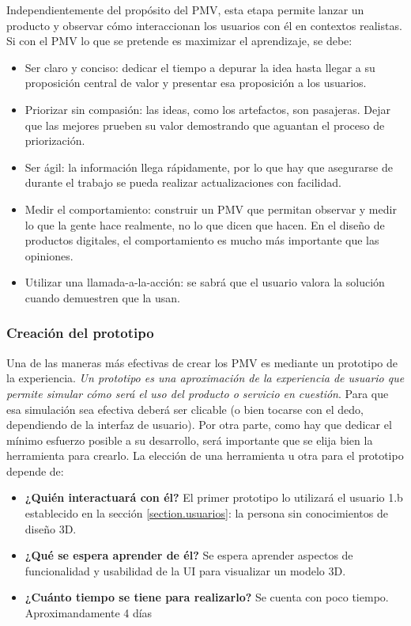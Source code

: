Independientemente del propósito del PMV, esta etapa permite lanzar un producto y observar cómo interaccionan los usuarios con él en contextos realistas. Si con el PMV lo que se pretende es maximizar el aprendizaje, se debe:
\begin{itemize}
    \item Ser claro y conciso: dedicar el tiempo a depurar la idea hasta llegar a su proposición central de valor y presentar esa proposición a los usuarios. 
    \item Priorizar sin compasión: las ideas, como los artefactos, son pasajeras. Dejar que las mejores prueben su valor demostrando que aguantan el proceso de priorización. 
    \item Ser ágil: la información llega rápidamente, por lo que hay que asegurarse de durante el trabajo se pueda realizar actualizaciones con facilidad. 
    \item Medir el comportamiento: construir un PMV que permitan observar y medir lo que la gente hace realmente, no lo que dicen que hacen. En el diseño de productos digitales, el comportamiento es mucho más importante que las opiniones. 
    \item Utilizar una llamada-a-la-acción: se sabrá que el usuario valora la solución cuando demuestren que la usan.
\end{itemize}

\subsubsection{Creación del prototipo}
Una de las maneras más efectivas de crear los PMV es mediante un prototipo de la experiencia. \textit{Un prototipo es una aproximación de la experiencia de usuario que permite simular cómo será el uso del producto o servicio en cuestión}. Para que esa simulación sea efectiva deberá ser clicable (o bien tocarse con el dedo, dependiendo de la interfaz de usuario).
Por otra parte, como hay que dedicar el mínimo esfuerzo posible a su desarrollo, será importante que se elija bien la herramienta para crearlo. La elección de una herramienta u otra para el prototipo depende de: 
\begin{itemize}
    \item \textbf{¿Quién interactuará con él?} El primer prototipo lo utilizará el usuario 1.b establecido en la sección \ref{section.usuarios}: la persona sin conocimientos de diseño 3D.
    \item \textbf{¿Qué se espera aprender de él?} Se espera aprender aspectos de funcionalidad y usabilidad de la UI para visualizar un modelo 3D.
    \item \textbf{¿Cuánto tiempo se tiene para realizarlo?} Se cuenta con poco tiempo. Aproximandamente 4 días
\end{itemize}
  

